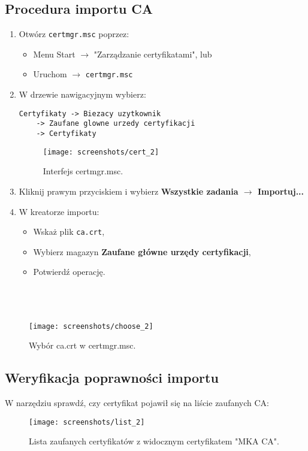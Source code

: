 \documentclass{article}
\begin{document}
\subsection{Procedura importu CA}
\begin{enumerate}
    \item Otwórz \texttt{certmgr.msc} poprzez:
    \begin{itemize}
        \item Menu Start $\rightarrow$ "Zarządzanie certyfikatami", lub
        \item Uruchom $\rightarrow$ \texttt{certmgr.msc}
    \end{itemize}

    \item W drzewie nawigacyjnym wybierz:
    \begin{lstlisting}[]
Certyfikaty -> Biezacy uzytkownik 
    -> Zaufane glowne urzedy certyfikacji 
    -> Certyfikaty
    \end{lstlisting}

    \begin{figure}[H]
    \centering
    \texttt{[image: screenshots/cert\_2]}
    \caption{Interfejs certmgr.msc.}
    \label{fig:certmgr_ui}
\end{figure}

    \item Kliknij prawym przyciskiem i wybierz \textbf{Wszystkie zadania $\rightarrow$ Importuj...}
\\
    \item W kreatorze importu:
    \begin{itemize}
        \item Wskaż plik \texttt{ca.crt},
        \item Wybierz magazyn \textbf{Zaufane główne urzędy certyfikacji},
        \item Potwierdź operację. \\ \\ \\ \\ 
    \end{itemize}
\end{enumerate}

\begin{figure}[h]
    \centering
    \texttt{[image: screenshots/choose\_2]}
    \caption{Wybór ca.crt w certmgr.msc.}
    \label{fig:certmgr_ui}
\end{figure}

\subsection{Weryfikacja poprawności importu}
W narzędziu sprawdź, czy certyfikat pojawił się na liście zaufanych CA:
\begin{figure}[H]
    \centering
    \texttt{[image: screenshots/list\_2]}
    \caption{Lista zaufanych certyfikatów z widocznym certyfikatem "MKA CA".}
    \label{fig:ca_in_store}
\end{figure}
\end{document}
